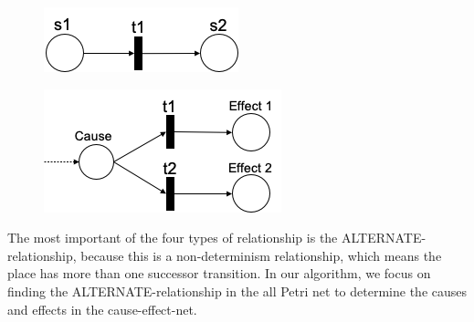 \begin{figure}
\centering
\begin{minipage}{.5\textwidth}
  \centering
  \includegraphics[width=.8\linewidth]{src/pic/SINGLE.png}
  \label{fig:SINGLE-relationship}
\end{minipage}%
\begin{minipage}{.5\textwidth}
  \centering
  \includegraphics[width=.9\linewidth]{src/pic/ALTERNATE.png}
  \label{fig:ALTERNATE-relationship}
\end{minipage}
\end{figure}

The most important of the four types of relationship is the ALTERNATE-relationship, because this is a non-determinism relationship, which means the place has more than one successor transition. In our algorithm, we focus on finding the ALTERNATE-relationship in the all Petri net to determine the causes and effects in the cause-effect-net.




